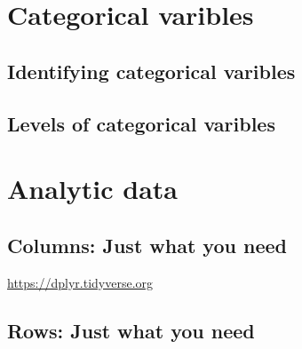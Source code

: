 \documentclass[
]{krantz}
\makeatletter
\newenvironment{Shaded}{\begin{snugshade}}{\end{snugshade}}
\newcommand{\DataTypeTok}[1]{\textcolor[rgb]{0.27,0.27,0.27}{#1}}
\newcommand{\KeywordTok}[1]{\textcolor[rgb]{0.27,0.27,0.27}{\textbf{#1}}}
\newcommand{\NormalTok}[1]{#1}
\newcommand{\OperatorTok}[1]{\textcolor[rgb]{0.43,0.43,0.43}{\textbf{#1}}}
\newcommand{\OtherTok}[1]{\textcolor[rgb]{0.37,0.37,0.37}{#1}}
\newcommand{\StringTok}[1]{\textcolor[rgb]{0.5,0.5,0.5}{#1}}
\newenvironment{kframe}{%
\medskip{}
\setlength{\fboxsep}{.8em}
 \def\at@end@of@kframe{}%
 \ifinner\ifhmode%
  \def\at@end@of@kframe{\end{minipage}}%
  \begin{minipage}{\columnwidth}%
 \fi\fi%
 \def\FrameCommand##1{\hskip\@totalleftmargin \hskip-\fboxsep
 \colorbox{shadecolor}{##1}\hskip-\fboxsep
     \hskip-\linewidth \hskip-\@totalleftmargin \hskip\columnwidth}%
 \MakeFramed {\advance\hsize-\width
   \@totalleftmargin\z@ \linewidth\hsize
   \@setminipage}}%
 {\par\unskip\endMakeFramed%
 \at@end@of@kframe}
\renewenvironment{Shaded}{\begin{kframe}}{\end{kframe}}
\makeatother
\begin{document}
\begin{Shaded}
\end{Shaded}

\hypertarget{categorical-varibles}{%
\section{Categorical varibles}\label{categorical-varibles}}

\hypertarget{identifying-categorical-varibles}{%
\subsection{Identifying categorical varibles}\label{identifying-categorical-varibles}}

\hypertarget{levels-of-categorical-varibles}{%
\subsection{Levels of categorical varibles}\label{levels-of-categorical-varibles}}

\hypertarget{analytic-data}{%
\section{Analytic data}\label{analytic-data}}

\hypertarget{columns-just-what-you-need}{%
\subsection{Columns: Just what you need}\label{columns-just-what-you-need}}

\url{https://dplyr.tidyverse.org}

\hypertarget{rows-just-what-you-need}{%
\subsection{Rows: Just what you need}\label{rows-just-what-you-need}}
\end{document}
